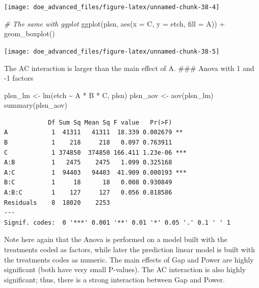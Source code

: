 \documentclass[
]{book}
\newenvironment{Shaded}{\begin{snugshade}}{\end{snugshade}}
\newcommand{\AttributeTok}[1]{\textcolor[rgb]{0.77,0.63,0.00}{#1}}
\newcommand{\CommentTok}[1]{\textcolor[rgb]{0.56,0.35,0.01}{\textit{#1}}}
\newcommand{\FunctionTok}[1]{\textcolor[rgb]{0.00,0.00,0.00}{#1}}
\newcommand{\NormalTok}[1]{#1}
\newcommand{\OtherTok}[1]{\textcolor[rgb]{0.56,0.35,0.01}{#1}}
\newcommand{\SpecialCharTok}[1]{\textcolor[rgb]{0.00,0.00,0.00}{#1}}
\begin{document}
\texttt{[image: doe\_advanced\_files/figure-latex/unnamed-chunk-38-4]}

\begin{Shaded}
\begin{Highlighting}[]
\CommentTok{\# The same with ggplot}
\FunctionTok{ggplot}\NormalTok{(plsn, }\FunctionTok{aes}\NormalTok{(}\AttributeTok{x =}\NormalTok{ C, }\AttributeTok{y =}\NormalTok{ etch, }\AttributeTok{fill =}\NormalTok{ A)) }\SpecialCharTok{+}
  \FunctionTok{geom\_boxplot}\NormalTok{()}
\end{Highlighting}
\end{Shaded}

\texttt{[image: doe\_advanced\_files/figure-latex/unnamed-chunk-38-5]}

The AC interaction is larger than the main effect of A.
\#\#\# Anova with 1 and -1 factors

\begin{Shaded}
\begin{Highlighting}[]
\NormalTok{plsn\_lm }\OtherTok{\textless{}{-}} \FunctionTok{lm}\NormalTok{(etch }\SpecialCharTok{\textasciitilde{}}\NormalTok{ A }\SpecialCharTok{*}\NormalTok{ B }\SpecialCharTok{*}\NormalTok{ C, plsn)}
\NormalTok{plsn\_aov }\OtherTok{\textless{}{-}} \FunctionTok{aov}\NormalTok{(plsn\_lm)}
\FunctionTok{summary}\NormalTok{(plsn\_aov)}
\end{Highlighting}
\end{Shaded}

\begin{verbatim}
            Df Sum Sq Mean Sq F value   Pr(>F)    
A            1  41311   41311  18.339 0.002679 ** 
B            1    218     218   0.097 0.763911    
C            1 374850  374850 166.411 1.23e-06 ***
A:B          1   2475    2475   1.099 0.325168    
A:C          1  94403   94403  41.909 0.000193 ***
B:C          1     18      18   0.008 0.930849    
A:B:C        1    127     127   0.056 0.818586    
Residuals    8  18020    2253                     
---
Signif. codes:  0 '***' 0.001 '**' 0.01 '*' 0.05 '.' 0.1 ' ' 1
\end{verbatim}

Note here again that the Anova is performed on a model built with the treatments coded as factors, while later the prediction linear model is built with the treatments codes as numeric.
The main effects of Gap and Power are highly significant (both have very small P-values). The AC interaction is also highly significant; thus, there is a strong interaction between Gap and Power.
\end{document}
